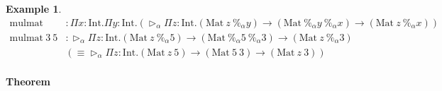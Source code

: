 \documentclass[9pt, a4paper]{extarticle}
\theoremstyle{break}
\newtheorem{ex}{Example}
\newcommand{\figheader}[2]{
  \begin{flushleft}
    #2 {\bf \normalsize #1}
\end{flushleft}}
\newcommand{\TW}{\triangleright}
\newcommand{\E}{\equiv}
\begin{document}
	\begin{ex}
		\newcommand{\I}{\textrm{Int}}
		\newcommand{\M}{\textrm{Mat}}
		\begin{align*}
			\text{mulmat}       & : \Pi x:\I.\Pi y:\I.(\TW_\alpha \Pi z:\I.(\M\ z\ \%_\alpha y) \to (\M\ \%_\alpha y\ \%_\alpha x) \to (\M\ z\ \%_\alpha x)) \\
			\text{mulmat}\ 3\ 5 & : \TW_\alpha \Pi z:\I.(\M\ z\ \%_\alpha 5) \to (\M\ \%_\alpha 5\ \%_\alpha 3) \to (\M\ z\ \%_\alpha 3)                     \\
			                    & (\E \TW_\alpha \Pi z:\I.(\M\ z\ 5) \to (\M\ 5\ 3) \to (\M\ z\ 3) )                                                         \\
		\end{align*}
	\end{ex}

\fi

\figheader{Theorem}{}


\end{document}

